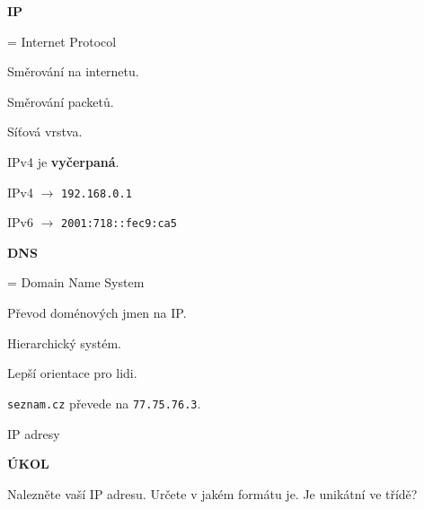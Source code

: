 \documentclass[aspectratio=1610]{beamer}
\begin{document}
\begin{frame}
    \begin{multicols}{2}
        \centering
        

        \begin{cardTiny}
            \textbf{IP}
            
            \begin{flushleft}
            = Internet Protocol

            \vspace{2ex}
            Směrování na internetu.

            Směrování packetů.

            Síťová vrstva.

            \vspace{2ex}
            IPv4 je \textbf{vyčerpaná}.

            \vspace{2ex}
            IPv4 $\rightarrow$ \texttt{192.168.0.1}

            IPv6 $\rightarrow$ \texttt{2001:718::fec9:ca5}
            \end{flushleft}
        \end{cardTiny}

        \begin{cardTiny}
            \textbf{DNS}
        
            \begin{flushleft}
            = Domain Name System

            \vspace{2ex}
            Převod doménových jmen na IP.
            
            \vspace{2ex}
            Hierarchický systém.

            Lepší orientace pro lidi.

            \vspace{2ex}
            \texttt{seznam.cz} převede na \texttt{77.75.76.3}.

            \end{flushleft}
        \end{cardTiny}
    \end{multicols}
\end{frame}


\begin{frame}{IP adresy}
    \begin{cardTiny}
        \begin{center}
            \textbf{ÚKOL}
        \end{center}
        \begin{flushleft}
            Nalezněte vaší IP adresu. Určete v jakém formátu je. Je unikátní ve třídě?
        \end{flushleft}
    \end{cardTiny}
\end{frame}
\end{document}
